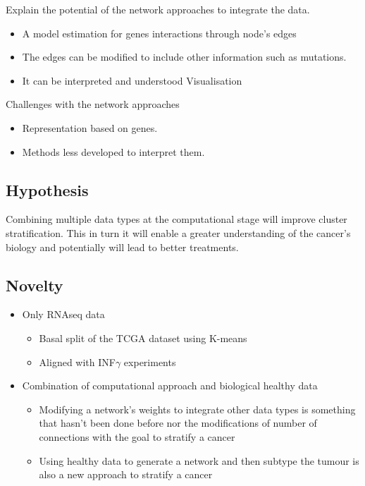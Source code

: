 Explain the potential of the network approaches to integrate the data.
\begin{itemize}
    \item A model estimation for genes interactions through node’s edges
    \item The edges can be modified to include other information such as mutations.
    \item It can be interpreted and understood 
    Visualisation
\end{itemize}

Challenges with the network approaches
\begin{itemize}
    \item Representation based on genes.
    \item Methods less developed to interpret them. 
\end{itemize}

\subsection{Hypothesis} 

Combining multiple data types at the computational stage will improve cluster stratification. This in turn it will enable a greater understanding of the cancer's biology and potentially will lead to better treatments.


\subsection{Novelty} 


\begin{itemize}
    \item Only RNAseq data
    \begin{itemize}
        \item Basal split of the TCGA dataset using K-means 
        \item Aligned with INF$\gamma$ experiments
    \end{itemize}
    \item Combination of computational approach and biological healthy data
    \begin{itemize}
        \item Modifying a network's weights to integrate other data types is something that hasn’t been done before nor the modifications of number of connections with the goal to stratify a cancer 
        \item Using healthy data to generate a network and then subtype the tumour is also a new approach to stratify a cancer
    \end{itemize}
\end{itemize}


